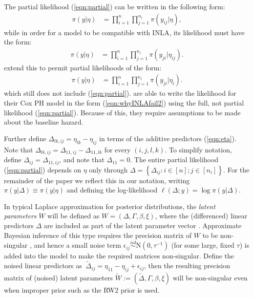\documentclass[ba]{imsart}
\begin{document}
The partial likelihood (\ref{eqn:partial}) can be written in the following form:
\begin{equation}\begin{aligned}\label{eqn:whyINLAfail1}
\pi(y|\eta) &= \prod_{i=1}^{n}\prod_{j=1}^{n_{i}} \pi(y_{ij}|\eta),
\end{aligned}\end{equation}
while in order for a model to be compatible with INLA, its likelihood must have the form:
\begin{equation}\begin{aligned}\label{eqn:whyINLAfail2}
\pi(y|\eta) &= \prod_{i=1}^{n}\prod_{j=1}^{n_{i}} \pi(y_{ji}|\eta_{ij}).
\end{aligned}\end{equation}
\cite{casecross} extend this to permit partial likelihoods of the form:
\begin{equation}\begin{aligned}\label{eqn:casecrosslik}
\pi(y|\eta) &= \prod_{i=1}^{n}\prod_{j=1}^{n_{i}} \pi(y_{ji}|\eta_{i}).
\end{aligned}\end{equation}
which still does not include (\ref{eqn:partial}). \cite{inlacoxph} are able to write the likelihood for their Cox PH model in the form (\ref{eqn:whyINLAfail2}) using the full, not partial likelihood (\ref{eqn:partial}). Because of this, they require assumptions to be made about the baseline hazard.

Further define $\Delta_{lk,ij} = \eta_{lk} - \eta_{ij}$ in terms of the additive predictors (\ref{eqn:eta}). Note that $\Delta_{lk,ij} = \Delta_{11,ij} - \Delta_{11,lk}$ for every $(i,j,l,k)$. To simplify notation, define $\Delta_{ij} = \Delta_{11,ij}$, and note that $\Delta_{11} = 0$. The entire partial likelihood (\ref{eqn:partial}) depends on $\eta$ only through  $\Delta = \left\{\Delta_{ij}: i \in [n]; j \in [n_{i}] \right\}$. For the remainder of the paper we reflect this in our notation, writing $\pi(y|\Delta) \equiv \pi(y|\eta)$ and defining the log-likelihood $\ell(\Delta; y) = \log\pi(y|\Delta)$.

In typical Laplace approximation for posterior distributions, the \textit{latent parameters} $W$ will be defined as $W = \left(\Delta, \Gamma,\beta, \xi \right)$, where the (differenced) linear predictors $\Delta$ are included as part of the latent parameter vector \citep{inla,inlacoxph,casecross}. Approximate Bayesian inference of this type requires the precision matrix of $W$ to be non-singular \citep{tierney}, and hence a small noise term $\epsilon_{ij} \stackrel{iid}{\sim} \text{N}(0,\tau^{-1})$ (for some large, fixed $\tau$) is added into the model to make the required matrices non-singular. Define the noised linear predictors as $\ \tilde{\Delta}_{ij} = \eta_{11} - \eta_{ij} + \epsilon_{ij}$, then the resulting precision matrix of (noised) latent parameters $\tilde{W} := (\tilde{\Delta}, \Gamma,\beta, \xi )$ will be non-singular even when improper prior such as the RW2 prior is used.
\end{document}
